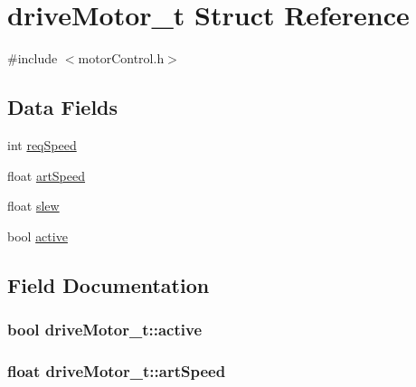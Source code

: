 \hypertarget{structdrive_motor__t}{}\section{drive\+Motor\+\_\+t Struct Reference}
\label{structdrive_motor__t}


{\ttfamily \#include $<$motor\+Control.\+h$>$}

\subsection*{Data Fields}
\begin{DoxyCompactItemize}
\item 
int \hyperlink{structdrive_motor__t_aea9a93b1f840f9518837e4ce4cdf5665}{req\+Speed}
\item 
float \hyperlink{structdrive_motor__t_a6256e735190a5d8ea8f82224f436ea40}{art\+Speed}
\item 
float \hyperlink{structdrive_motor__t_a4449f6ef1d4485bd57ac184b4024629e}{slew}
\item 
bool \hyperlink{structdrive_motor__t_a7f0f842884b01b099eea96da65300fd5}{active}
\end{DoxyCompactItemize}


\subsection{Field Documentation}
\subsubsection[{\texorpdfstring{active}{active}}]{\setlength{\rightskip}{0pt plus 5cm}bool drive\+Motor\+\_\+t\+::active}\hypertarget{structdrive_motor__t_a7f0f842884b01b099eea96da65300fd5}{}\label{structdrive_motor__t_a7f0f842884b01b099eea96da65300fd5}
\subsubsection[{\texorpdfstring{art\+Speed}{artSpeed}}]{\setlength{\rightskip}{0pt plus 5cm}float drive\+Motor\+\_\+t\+::art\+Speed}\hypertarget{structdrive_motor__t_a6256e735190a5d8ea8f82224f436ea40}{}\label{structdrive_motor__t_a6256e735190a5d8ea8f82224f436ea40}
